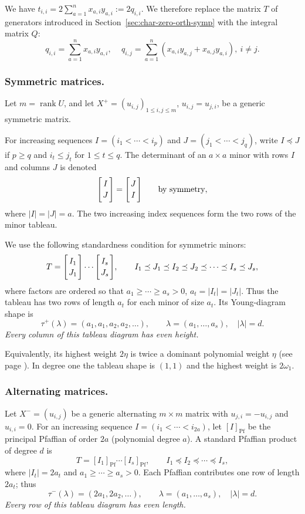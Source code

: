 \documentclass[10pt]{amsart}
\theoremstyle{definition}
\theoremstyle{remark}
\begin{document}
We have  
 $t_{i,i}=2\sum_{a=1}^n x_{a,i}y_{a,i}:=2q_{i,i} $.
 We therefore replace the matrix $T$ of generators
introduced in Section~\ref{sec:char-zero-orth-symp}
with the integral matrix $Q$:
\begin{equation}\label{imq}
 q_{i,i}=\sum_{a=1}^n x_{a,i}y_{a,i},
\,\quad 
 q_{i,j}=\sum_{a=1}^n(x_{a,i}y_{a,j}+x_{a,j}y_{a,i}),\ i\neq j.
\end{equation}
 



\subsubsection{Symmetric matrices.}
Let $m=\operatorname{rank} U$, and let $X^+=(u_{i,j})_{1\le i,j\le m}$, $u_{i,j}=u_{j,i}$,
be a generic symmetric matrix. 

 For increasing sequences
$I=(i_1<\cdots<i_p)$ and $J=(j_1<\cdots<j_q)$, write
$I\preceq J$ if $p\ge q$ and $i_t\le j_t$ for $1\le t\le q$. The determinant of an $a\times a$  minor with rows $I$ and columns $J$ is denoted 
$$\Bigg [ {I \atop   J}\Bigg]=\Bigg [ {J\atop  I}\Bigg]\qquad \text{by symmetry},$$
where $|I|=|J|=a$. The two increasing index sequences
form the two rows of the minor tableau. \smallskip

We use the following standardness condition for symmetric minors:
\[
 T=\Bigg [ {I_1\atop  J_1}\Bigg]\cdots\Bigg [ {I_s\atop  J_s}\Bigg],\qquad
 I_1\preceq J_1\preceq I_2\preceq J_2\preceq\cdots
 \preceq I_s\preceq J_s,
\]
where factors are ordered so that $a_1\ge\cdots\ge a_s>0$,
$a_t=|I_t|=|J_t|$. Thus the tableau has two rows of length
$a_t$ for each minor of size $a_t$. Its Young-diagram shape is
\[
 \tau^+(\lambda)=(a_1,a_1,a_2,a_2,\ldots),\qquad
 \lambda=(a_1,\ldots,a_s),\quad |\lambda|=d.
\]
\emph{Every column of this tableau diagram has even height.}

Equivalently, its highest weight $2\eta$ is twice a dominant
polynomial weight $\eta$ (see page \pageref{sec:direct-good-filtration}). In degree one the tableau shape
is $(1,1)$ and the highest weight is $2\omega_1$.\smallskip


\subsubsection{Alternating matrices.}
Let $X^-=(u_{i,j})$ be a generic alternating $m\times m$ matrix with
$u_{j,i}=-u_{i,j}$ and $u_{i,i}=0$. For an increasing
sequence $I=(i_1<\cdots<i_{2a})$, let $[I]_{\mathrm{Pf}}$
be the principal Pfaffian of order $2a$ (polynomial degree $a$).
A standard Pfaffian product of degree $d$ is
\[
 T=[I_1]_{\mathrm{Pf}}\cdots[I_s]_{\mathrm{Pf}},\qquad
 I_1\preceq I_2\preceq\cdots\preceq I_s,
\]
where $|I_t|=2a_t$ and $a_1\ge\cdots\ge a_s>0$.
Each Pfaffian contributes one row of length $2a_t$; thus
\[
 \tau^-(\lambda)=(2a_1,2a_2,\ldots),\qquad
 \lambda=(a_1,\ldots,a_s),\quad |\lambda|=d.
\]
\emph{Every row of this tableau diagram has even length.}
 
\end{document}
